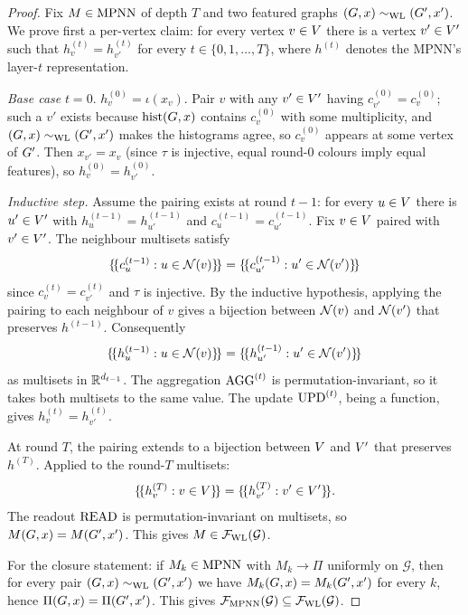 \begin{proof}
Fix $M \in \mathrm{MPNN}$ of depth $T$ and two featured graphs $(G, x)
\sim_{\mathrm{WL}} (G', x')$. We prove first a per-vertex claim: for
every vertex $v \in V$ there is a vertex $v' \in V'$
such that $h_v^{(t)} = h_{v'}^{(t)}$ for every $t \in \{0, 1,
\dots, T\}$, where $h^{(t)}$ denotes the MPNN's layer-$t$
representation.

\emph{Base case} $t = 0$. $h_v^{(0)} = \iota(x_v)$. Pair $v$ with any
$v' \in V'$ having $c_{v'}^{(0)} = c_v^{(0)}$; such a $v'$
exists because $\mathrm{hist}(G, x)$ contains $c_v^{(0)}$ with
some multiplicity, and $(G, x) \sim_{\mathrm{WL}} (G', x')$ makes the
histograms agree, so $c_v^{(0)}$ appears at some vertex of $G'$.
Then $x_{v'} = x_v$ (since $\tau$ is injective, equal round-$0$
colours imply equal features), so $h_v^{(0)} = h_{v'}^{(0)}$.

\emph{Inductive step.} Assume the pairing exists at round $t-1$:
for every $u \in V$ there is $u' \in V'$ with
$h_u^{(t-1)} = h_{u'}^{(t-1)}$ and $c_u^{(t-1)} = c_{u'}^{(t-1)}$.
Fix $v \in V$ paired with $v' \in V'$. The
neighbour multisets satisfy
\[
\{\!\{c_u^{(t-1)} : u \in \mathcal{N}(v)\}\!\} = \{\!\{c_{u'}^{(t-1)} : u'
\in \mathcal{N}(v')\}\!\}
\]
since $c_v^{(t)} = c_{v'}^{(t)}$ and $\tau$ is injective. By the
inductive hypothesis, applying the pairing to each neighbour of $v$
gives a bijection between $\mathcal{N}(v)$ and $\mathcal{N}(v')$ that
preserves $h^{(t-1)}$. Consequently
\[
\{\!\{h_u^{(t-1)} : u \in \mathcal{N}(v)\}\!\} = \{\!\{h_{u'}^{(t-1)} :
u' \in \mathcal{N}(v')\}\!\}
\]
as multisets in $\mathbb{R}^{d_{t-1}}$. The aggregation $\mathrm{AGG}^{(t)}$ is
permutation-invariant, so it takes both multisets to the same value.
The update $\mathrm{UPD}^{(t)}$, being a function, gives $h_v^{(t)} =
h_{v'}^{(t)}$.

At round $T$, the pairing extends to a bijection between
$V$ and $V'$ that preserves $h^{(T)}$. Applied to
the round-$T$ multisets:
\[
\{\!\{h_v^{(T)} : v \in V\}\!\} = \{\!\{h_{v'}^{(T)} : v'
\in V'\}\!\}.
\]
The readout $\mathrm{READ}$ is permutation-invariant on multisets, so
$M(G, x) = M(G', x')$. This gives $M \in \mathcal{F}_{\mathrm{WL}}(\mathcal{G})$.

For the closure statement: if $M_k \in \mathrm{MPNN}$ with $M_k \to \Pi$
uniformly on $\mathcal{G}$, then for every pair $(G, x) \sim_{\mathrm{WL}}
(G', x')$ we have $M_k(G, x) = M_k(G', x')$ for every $k$,
hence $\Pi(G, x) = \Pi(G', x')$. This gives
$\mathcal{F}_{\mathrm{MPNN}}(\mathcal{G}) \subseteq \mathcal{F}_{\mathrm{WL}}(\mathcal{G})$.
\end{proof}

